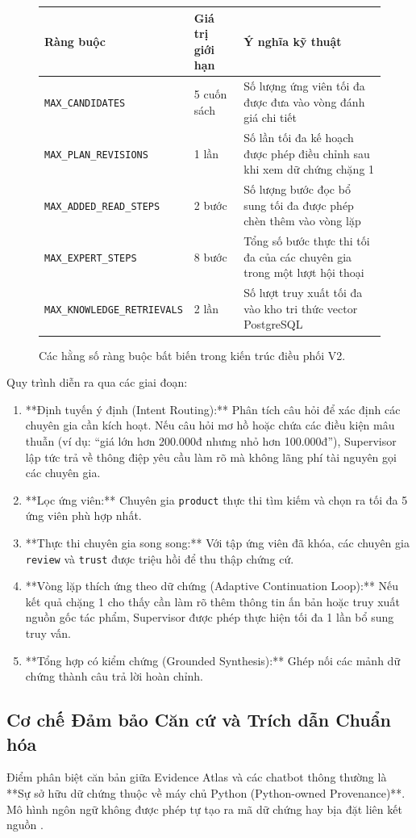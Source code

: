 \begin{figure}[htbp]\small
\centering
\begin{tabularx}{\linewidth}{lP{28mm}Y}\toprule
Ràng buộc & Giá trị giới hạn & Ý nghĩa kỹ thuật\\\midrule
\texttt{MAX\_CANDIDATES} & 5 cuốn sách & Số lượng ứng viên tối đa được đưa vào vòng đánh giá chi tiết\\
\texttt{MAX\_PLAN\_REVISIONS} & 1 lần & Số lần tối đa kế hoạch được phép điều chỉnh sau khi xem dữ chứng chặng 1\\
\texttt{MAX\_ADDED\_READ\_STEPS} & 2 bước & Số lượng bước đọc bổ sung tối đa được phép chèn thêm vào vòng lặp\\
\texttt{MAX\_EXPERT\_STEPS} & 8 bước & Tổng số bước thực thi tối đa của các chuyên gia trong một lượt hội thoại\\
\texttt{MAX\_KNOWLEDGE\_RETRIEVALS} & 2 lần & Số lượt truy xuất tối đa vào kho tri thức vector PostgreSQL\\\bottomrule
\end{tabularx}
\caption{Các hằng số ràng buộc bất biến trong kiến trúc điều phối V2.}
\end{figure}

Quy trình diễn ra qua các giai đoạn:
\begin{enumerate}
    \item **Định tuyến ý định (Intent Routing):** Phân tích câu hỏi để xác định các chuyên gia cần kích hoạt. Nếu câu hỏi mơ hồ hoặc chứa các điều kiện mâu thuẫn (ví dụ: ``giá lớn hơn 200.000đ nhưng nhỏ hơn 100.000đ''), Supervisor lập tức trả về thông điệp yêu cầu làm rõ mà không lãng phí tài nguyên gọi các chuyên gia.
    \item **Lọc ứng viên:** Chuyên gia \texttt{product} thực thi tìm kiếm và chọn ra tối đa 5 ứng viên phù hợp nhất.
    \item **Thực thi chuyên gia song song:** Với tập ứng viên đã khóa, các chuyên gia \texttt{review} và \texttt{trust} được triệu hồi để thu thập chứng cứ.
    \item **Vòng lặp thích ứng theo dữ chứng (Adaptive Continuation Loop):** Nếu kết quả chặng 1 cho thấy cần làm rõ thêm thông tin ấn bản hoặc truy xuất nguồn gốc tác phẩm, Supervisor được phép thực hiện tối đa 1 lần bổ sung truy vấn.
    \item **Tổng hợp có kiểm chứng (Grounded Synthesis):** Ghép nối các mảnh dữ chứng thành câu trả lời hoàn chỉnh.
\end{enumerate}

\subsection{Cơ chế Đảm bảo Căn cứ và Trích dẫn Chuẩn hóa}
Điểm phân biệt căn bản giữa Evidence Atlas và các chatbot thông thường là **Sự sở hữu dữ chứng thuộc về máy chủ Python (Python-owned Provenance)**. Mô hình ngôn ngữ không được phép tự tạo ra mã dữ chứng hay bịa đặt liên kết nguồn .

